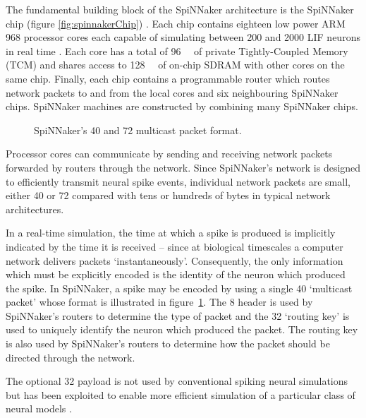 		The fundamental building block of the SpiNNaker architecture is the
		SpiNNaker chip (figure \ref{fig:spinnakerChip}) \cite{furber13}. Each chip
		contains eighteen low power ARM 968 processor cores each capable of
		simulating between \num{200} and \num{2000} LIF neurons in real time
		\cite{mundy15}.  Each core has a total of \SI{96}{\kilo\byte} of private
		Tightly-Coupled Memory (TCM) and shares access to \SI{128}{\mega\byte} of
		on-chip SDRAM with other cores on the same chip. Finally, each chip
		contains a programmable router which routes network packets to and from the
		local cores and six neighbouring SpiNNaker chips. SpiNNaker machines are
		constructed by combining many SpiNNaker chips.
		
		\begin{figure}
			\center
			
			\caption{SpiNNaker's \SI{40}{\bit} and \SI{72}{\bit} multicast packet
			format.}
			\label{fig:spinnaker-packet}
		\end{figure}
		
		Processor cores can communicate by sending and receiving network packets
		forwarded by routers through the network. Since SpiNNaker's network is
		designed to efficiently transmit neural spike events, individual network
		packets are small, either \SI{40}{\bit} or \SI{72}{\bit} compared with tens
		or hundreds of bytes in typical network architectures.
		
		In a real-time simulation, the time at which a spike is produced is
		implicitly indicated by the time it is received -- since at biological
		timescales a computer network delivers packets `instantaneously'.
		Consequently, the only information which must be explicitly encoded is the
		identity of the neuron which produced the spike. In SpiNNaker, a spike may
		be encoded by using a single \SI{40}{\bit} `multicast packet' whose format
		is illustrated in figure~\ref{fig:spinnaker-packet}.  The \SI{8}{\bit}
		header is used by SpiNNaker's routers to determine the type of packet and
		the \SI{32}{\bit} `routing key' is used to uniquely identify the neuron
		which produced the packet. The routing key is also used by SpiNNaker's
		routers to determine how the packet should be directed through the network.
		
		The optional \SI{32}{\bit} payload is not used by conventional spiking
		neural simulations \cite{galluppi10} but has been exploited to enable more
		efficient simulation of a particular class of neural models \cite{mundy15}.
	

